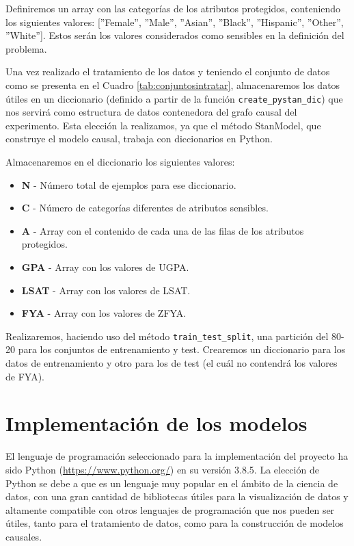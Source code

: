 \documentclass[oneside,openright,titlepage,numbers=noenddot,openany,headinclude,footinclude=true,
cleardoublepage=empty,abstractoff,BCOR=5mm,paper=a4,fontsize=12pt,main=spanish]{scrreprt}
\begin{document}
\clearpage

Definiremos un array con las categorías de los atributos protegidos, conteniendo los siguientes valores: [''Female'', ''Male'', ''Asian'', ''Black'', ''Hispanic'', ''Other'', ''White'']. Estos serán los valores considerados como sensibles en la definición del problema.

Una vez realizado el tratamiento de los datos y teniendo el conjunto de datos como se presenta en el Cuadro \ref{tab:conjuntosintratar}, almacenaremos los datos útiles en un diccionario (definido a partir de la función \texttt{create\_pystan\_dic}) que nos servirá como estructura de datos contenedora del grafo causal del experimento. Esta elección la realizamos, ya que el método StanModel, que construye el modelo causal, trabaja con diccionarios en Python.

Almacenaremos en el diccionario los siguientes valores:

\begin{itemize}
    \item \textbf{N} - Número total de ejemplos para ese diccionario.
    \item \textbf{C} - Número de categorías diferentes de atributos sensibles.
    \item \textbf{A} - Array con el contenido de cada una de las filas de los atributos protegidos.
    \item \textbf{GPA} - Array con los valores de UGPA.
    \item \textbf{LSAT} - Array con los valores de LSAT.
    \item \textbf{FYA} - Array con los valores de ZFYA.
\end{itemize}

Realizaremos, haciendo uso del método \texttt{train\_test\_split}, una partición del 80-20 para los conjuntos de entrenamiento y test. Crearemos un diccionario para los datos de entrenamiento y otro para los de test (el cuál no contendrá los valores de FYA).

\section{Implementación de los modelos}

El lenguaje de programación seleccionado para la implementación del proyecto ha sido Python (\url{https://www.python.org/}) en su versión 3.8.5. La elección de Python se debe a que es un lenguaje muy popular en el ámbito de la ciencia de datos, con una gran cantidad de bibliotecas útiles para la visualización de datos y altamente compatible con otros lenguajes de programación que nos pueden ser útiles, tanto para el tratamiento de datos, como para la construcción de modelos causales.
\end{document}

